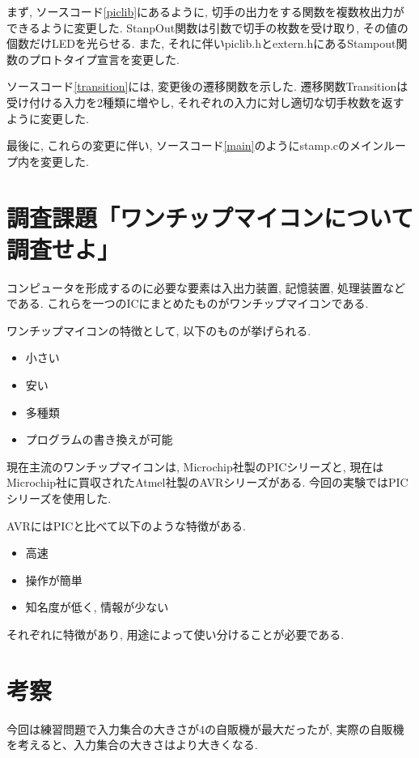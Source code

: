\documentclass[titlepage]{jsarticle}
\begin{document}
        まず, ソースコード\ref{piclib}にあるように, 切手の出力をする関数を複数枚出力ができるように変更した.
        StanpOut関数は引数で切手の枚数を受け取り, その値の個数だけLEDを光らせる.
        また, それに伴いpiclib.hとextern.hにあるStampout関数のプロトタイプ宣言を変更した.

        ソースコード\ref{transition}には, 変更後の遷移関数を示した.
        遷移関数Transitionは受け付ける入力を2種類に増やし,
        それぞれの入力に対し適切な切手枚数を返すように変更した.

        最後に, これらの変更に伴い, ソースコード\ref{main}のようにstamp.cのメインループ内を変更した.
    
\section{調査課題「ワンチップマイコンについて調査せよ」}
    コンピュータを形成するのに必要な要素は入出力装置, 記憶装置, 処理装置などである.
    これらを一つのICにまとめたものがワンチップマイコンである.

    ワンチップマイコンの特徴として, 以下のものが挙げられる.

    \begin{itemize}
        \item 小さい
        \item 安い
        \item 多種類
        \item プログラムの書き換えが可能
    \end{itemize}

    現在主流のワンチップマイコンは, Microchip社製のPICシリーズと,
    現在はMicrochip社に買収されたAtmel社製のAVRシリーズがある.
    今回の実験ではPICシリーズを使用した.

    AVRにはPICと比べて以下のような特徴がある.

    \begin{itemize}
        \item 高速
        \item 操作が簡単
        \item 知名度が低く, 情報が少ない
    \end{itemize}

    それぞれに特徴があり, 用途によって使い分けることが必要である.

\section{考察}
    今回は練習問題で入力集合の大きさが4の自販機が最大だったが,
    実際の自販機を考えると、入力集合の大きさはより大きくなる.
\end{document}
